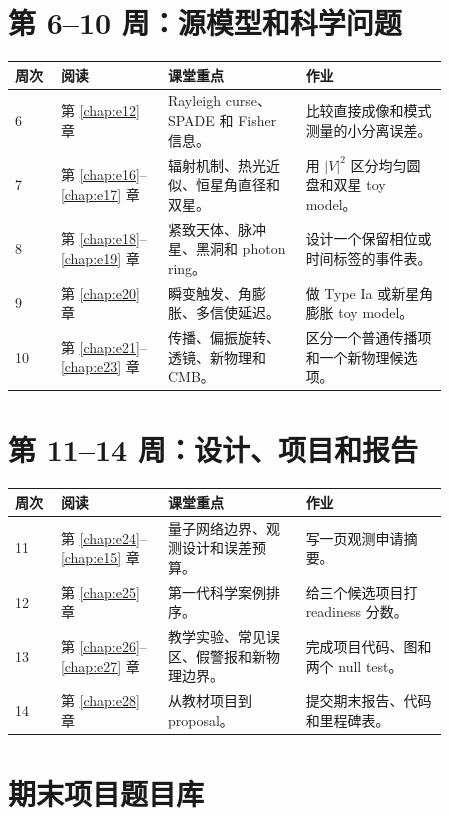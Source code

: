 \section{第 6--10 周：源模型和科学问题}
\label{appsec:f-science}

\begin{longtable}{@{}p{0.09\linewidth}p{0.21\linewidth}p{0.27\linewidth}p{0.29\linewidth}@{}}
\toprule
周次 & 阅读 & 课堂重点 & 作业 \\
\midrule
6 & 第 \ref{chap:e12} 章 & Rayleigh curse、SPADE 和 Fisher 信息。 & 比较直接成像和模式测量的小分离误差。 \\
7 & 第 \ref{chap:e16}--\ref{chap:e17} 章 & 辐射机制、热光近似、恒星角直径和双星。 & 用 \(|V|^2\) 区分均匀圆盘和双星 toy model。 \\
8 & 第 \ref{chap:e18}--\ref{chap:e19} 章 & 紧致天体、脉冲星、黑洞和 photon ring。 & 设计一个保留相位或时间标签的事件表。 \\
9 & 第 \ref{chap:e20} 章 & 瞬变触发、角膨胀、多信使延迟。 & 做 Type Ia 或新星角膨胀 toy model。 \\
10 & 第 \ref{chap:e21}--\ref{chap:e23} 章 & 传播、偏振旋转、透镜、新物理和 CMB。 & 区分一个普通传播项和一个新物理候选项。 \\
\bottomrule
\end{longtable}

\section{第 11--14 周：设计、项目和报告}
\label{appsec:f-project}

\begin{longtable}{@{}p{0.09\linewidth}p{0.21\linewidth}p{0.27\linewidth}p{0.29\linewidth}@{}}
\toprule
周次 & 阅读 & 课堂重点 & 作业 \\
\midrule
11 & 第 \ref{chap:e24}--\ref{chap:e15} 章 & 量子网络边界、观测设计和误差预算。 & 写一页观测申请摘要。 \\
12 & 第 \ref{chap:e25} 章 & 第一代科学案例排序。 & 给三个候选项目打 readiness 分数。 \\
13 & 第 \ref{chap:e26}--\ref{chap:e27} 章 & 教学实验、常见误区、假警报和新物理边界。 & 完成项目代码、图和两个 null test。 \\
14 & 第 \ref{chap:e28} 章 & 从教材项目到 proposal。 & 提交期末报告、代码和里程碑表。 \\
\bottomrule
\end{longtable}

\section{期末项目题目库}
\label{appsec:f-project-list}

